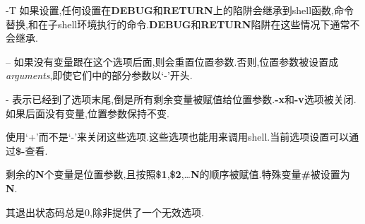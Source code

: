 \documentclass[draft,openany]{book}
\begin{document}
\begin{CJK}{UTF8}{gbsn}
\begin{basedescript}{\desclabelstyle{\nextlinelabel}\desclabelwidth{2.5em}}
    \item[-T] 如果设置,任何设置在\textbf{DEBUG}和\textbf{RETURN}上的陷阱会继承到shell函数,命令替换,和在子shell环境执行的命令.\textbf{DEBUG}和\textbf{RETURN}陷阱在这些情况下通常不会继承.
    \item[--] 如果没有变量跟在这个选项后面,则会重置位置参数.否则,位置参数被设置成\emph{arguments},即使它们中的部分参数以`-'开头.
    \item[-] 表示已经到了选项末尾,倒是所有剩余变量被赋值给位置参数.\textbf{-x}和\textbf{-v}选项被关闭.如果后面没有变量,位置参数保持不变.
    \end{basedescript}
    使用`+'而不是`-'来关闭这些选项.这些选项也能用来调用shell.当前选项设置可以通过\textbf{\$-}查看.\par
    剩余的\textbf{N}个变量是位置参数,且按照\textbf{\$1},\textbf{\$2},\ldots{}\textbf{N}的顺序被赋值.特殊变量\textbf{\#}被设置为\textbf{N}.\par
    其退出状态码总是0,除非提供了一个无效选项.


\end{CJK}
\end{document}
